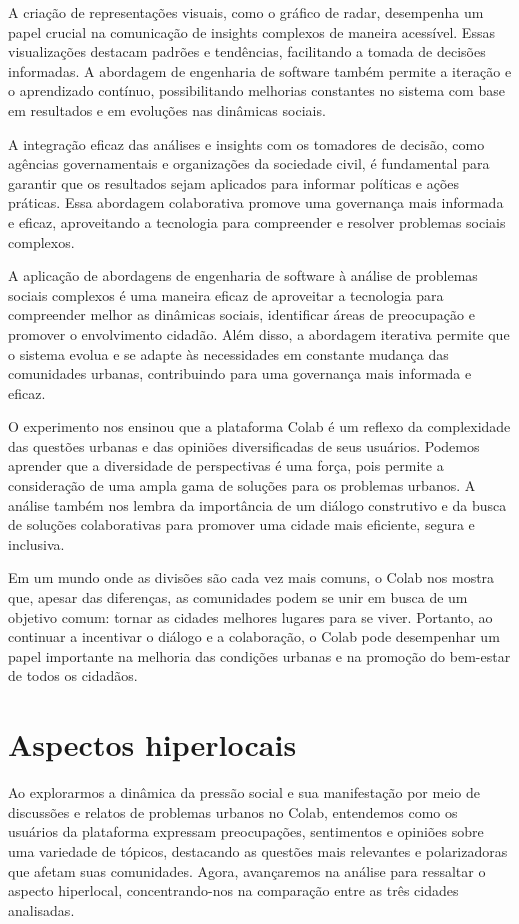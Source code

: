 A criação de representações visuais, como o gráfico de radar, desempenha um papel crucial na comunicação de insights complexos de maneira acessível. Essas visualizações destacam padrões e tendências, facilitando a tomada de decisões informadas. A abordagem de engenharia de software também permite a iteração e o aprendizado contínuo, possibilitando melhorias constantes no sistema com base em resultados e em evoluções nas dinâmicas sociais.

A integração eficaz das análises e insights com os tomadores de decisão, como agências governamentais e organizações da sociedade civil, é fundamental para garantir que os resultados sejam aplicados para informar políticas e ações práticas. Essa abordagem colaborativa promove uma governança mais informada e eficaz, aproveitando a tecnologia para compreender e resolver problemas sociais complexos.

A aplicação de abordagens de engenharia de software à análise de problemas sociais complexos é uma maneira eficaz de aproveitar a tecnologia para compreender melhor as dinâmicas sociais, identificar áreas de preocupação e promover o envolvimento cidadão. Além disso, a abordagem iterativa permite que o sistema evolua e se adapte às necessidades em constante mudança das comunidades urbanas, contribuindo para uma governança mais informada e eficaz.

O experimento nos ensinou que a plataforma Colab é um reflexo da complexidade das questões urbanas e das opiniões diversificadas de seus usuários. Podemos aprender que a diversidade de perspectivas é uma força, pois permite a consideração de uma ampla gama de soluções para os problemas urbanos. A análise também nos lembra da importância de um diálogo construtivo e da busca de soluções colaborativas para promover uma cidade mais eficiente, segura e inclusiva.

Em um mundo onde as divisões são cada vez mais comuns, o Colab nos mostra que, apesar das diferenças, as comunidades podem se unir em busca de um objetivo comum: tornar as cidades melhores lugares para se viver. Portanto, ao continuar a incentivar o diálogo e a colaboração, o Colab pode desempenhar um papel importante na melhoria das condições urbanas e na promoção do bem-estar de todos os cidadãos.

\section{Aspectos hiperlocais}

Ao explorarmos a dinâmica da pressão social e sua manifestação por meio de discussões e relatos de problemas urbanos no Colab, entendemos como os usuários da plataforma expressam preocupações, sentimentos e opiniões sobre uma variedade de tópicos, destacando as questões mais relevantes e polarizadoras que afetam suas comunidades. Agora, avançaremos na análise para ressaltar o aspecto hiperlocal, concentrando-nos na comparação entre as três cidades analisadas.


